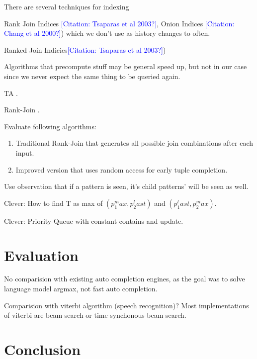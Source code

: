 \documentclass[11pt,a4paper]{report}
\newcommand{\mbref}[1]{\textcolor{blue}{\footnotesize[Citation: #1?]}}
\begin{document}
There are several techniques for indexing {Rank Join Indices \mbref{Tsaparas et
al 2003}, Onion Indices \mbref{Chang et al 2000}) which we don't use as history
changes to often.

Ranked Join Indicies\mbref{Tsaparas et al 2003})

Algorithms that precompute stuff may be general speed up, but not in our case
since we never expect the same thing to be queried again.

TA \parencite{Fagin2001}.

Rank-Join \parencite{Ilyas2004}.

Evaluate following algorithms:

\begin{enumerate}
  \item Traditional Rank-Join that generates all possible join combinations
    after each input.
  \item Improved version that uses random access for early tuple completion.
\end{enumerate}

Use observation that if a pattern is seen, it's child patterns' will be seen as
well.

Clever: How to find T as max of $(p_1^max, p_2^last)$ and $(p_1^last, p_2^max)$.

Clever: Priority-Queue with constant contains and update.

\chapter{Evaluation}

No comparision with existing auto completion engines, as the goal was to solve
language model argmax, not fast auto completion.

Comparision with viterbi algorithm (speech recognition)?
Most implementations of viterbi are beam search or time-synchonous beam search.

\chapter{Conclusion}

\printbibliography

\begin{appendices}


\end{appendices}}
\end{document}
